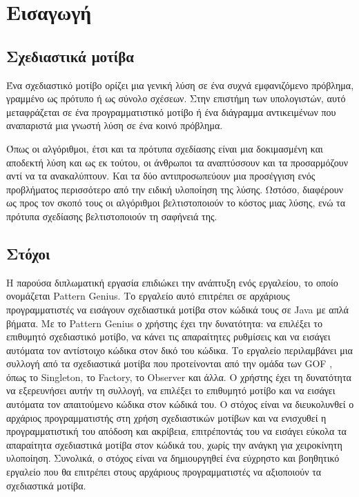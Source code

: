 \chapter{Εισαγωγή}
\label{ch:Introduction}
\section{Σχεδιαστικά μοτίβα}
\label{sec:patterns}
Ένα σχεδιαστικό μοτίβο \cite{GoF} ορίζει μια γενική λύση σε ένα συχνά εμφανιζόμενο πρόβλημα, γραμμένο
ως πρότυπο ή ως σύνολο σχέσεων. Στην επιστήμη των υπολογιστών, αυτό μεταφράζεται σε ένα
προγραμματιστικό μοτίβο ή ένα διάγραμμα αντικειμένων που αναπαριστά μια 
γνωστή λύση σε ένα κοινό πρόβλημα. \par
Όπως οι αλγόριθμοι, έτσι και τα πρότυπα σχεδίασης είναι μια δοκιμασμένη
και αποδεκτή λύση και ως εκ τούτου, οι άνθρωποι τα αναπτύσσουν και 
τα προσαρμόζουν αντί να τα ανακαλύπτουν.
Και τα δύο αντιπροσωπεύουν μια προσέγγιση ενός προβλήματος περισσότερο από 
την ειδική υλοποίηση της λύσης. Ωστόσο, διαφέρουν ως προς τον σκοπό τους 
οι αλγόριθμοι βελτιστοποιούν το κόστος μιας λύσης, 
ενώ τα πρότυπα σχεδίασης βελτιστοποιούν τη σαφήνειά της.
\section{Στόχοι}
\label{sec:Objectives}
Η παρούσα διπλωματική εργασία επιδιώκει την ανάπτυξη ενός εργαλείου, το οποίο ονομάζεται Pattern Genius. 
Το εργαλείο αυτό επιτρέπει σε αρχάριους προγραμματιστές να εισάγουν 
σχεδιαστικά μοτίβα στον κώδικά τους σε Java με απλά βήματα. 
Με το Pattern Genius ο χρήστης έχει την δυνατότητα: να επιλέξει το επιθυμητό 
σχεδιαστικό μοτίβο, να κάνει τις απαραίτητες ρυθμίσεις 
και να εισάγει αυτόματα τον αντίστοιχο κώδικα στον δικό του κώδικα. 
Το εργαλείο περιλαμβάνει μια συλλογή από τα σχεδιαστικά μοτίβα που 
προτείνονται από την ομάδα των GOF \cite{GoF}, 
όπως το Singleton, το Factory, το Observer και άλλα. 
Ο χρήστης έχει τη δυνατότητα να εξερευνήσει αυτήν τη συλλογή, να επιλέξει 
το επιθυμητό μοτίβο και να εισάγει αυτόματα τον απαιτούμενο κώδικα στον κώδικά 
του. Ο στόχος είναι να διευκολυνθεί ο αρχάριος προγραμματιστής στη χρήση 
σχεδιαστικών μοτίβων και να ενισχυθεί η προγραμματιστική του απόδοση και ακρίβεια, 
επιτρέποντάς του να εισάγει εύκολα τα απαραίτητα σχεδιαστικά μοτίβα στον κώδικά 
του, χωρίς την ανάγκη για χειροκίνητη υλοποίηση. 
Συνολικά, ο στόχος είναι να δημιουργηθεί ένα εύχρηστο και βοηθητικό 
εργαλείο που θα επιτρέπει στους αρχάριους προγραμματιστές να αξιοποιούν 
τα σχεδιαστικά μοτίβα.
